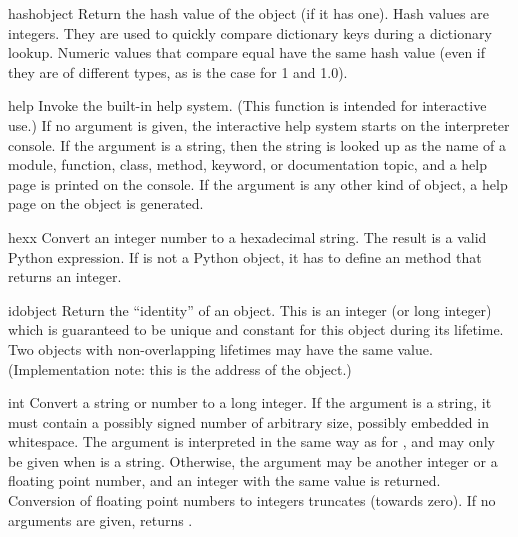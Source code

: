 \begin{funcdesc}{hash}{object}
  Return the hash value of the object (if it has one).  Hash values
  are integers.  They are used to quickly compare dictionary
  keys during a dictionary lookup.  Numeric values that compare equal
  have the same hash value (even if they are of different types, as is
  the case for 1 and 1.0).
\end{funcdesc}

\begin{funcdesc}{help}{}
  Invoke the built-in help system.  (This function is intended for
  interactive use.)  If no argument is given, the interactive help
  system starts on the interpreter console.  If the argument is a
  string, then the string is looked up as the name of a module,
  function, class, method, keyword, or documentation topic, and a
  help page is printed on the console.  If the argument is any other
  kind of object, a help page on the object is generated.
\end{funcdesc}

\begin{funcdesc}{hex}{x}
  Convert an integer number to a hexadecimal string.
  The result is a valid Python expression.  If  is not a Python
   object, it has to define an  method
  that returns an integer.
\end{funcdesc}

\begin{funcdesc}{id}{object}
  Return the ``identity'' of an object.  This is an integer (or long
  integer) which is guaranteed to be unique and constant for this
  object during its lifetime.  Two objects with non-overlapping lifetimes
  may have the same  value.  (Implementation
  note: this is the address of the object.)
\end{funcdesc}

\begin{funcdesc}{int}{}
  Convert a string or number to a long integer.  If the argument is a
  string, it must contain a possibly signed number of
  arbitrary size, possibly embedded in whitespace. The
   argument is interpreted in the same way as for
  , and may only be given when  is a string.
  Otherwise, the argument may be another
  integer or a floating point number, and an integer with
  the same value is returned.    Conversion of floating
  point numbers to integers truncates (towards zero).  If no arguments
  are given, returns .
\end{funcdesc}

